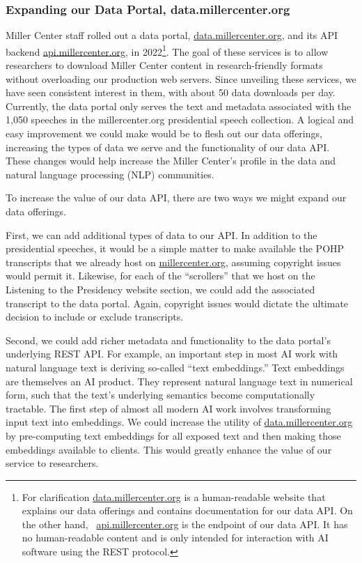 \documentclass[12pt, oneside]{article}   	%
\begin{document}
\subsubsection{Expanding our Data Portal, data.millercenter.org}\label{section.applications.easy.data-portal}
Miller Center staff rolled out a data portal, \href{https://data.millercenter.org}{data.millercenter.org}, and its API backend \href{https://api.millercenter.org}{api.millercenter.org}, in 2022\footnote{For clarification \href{https://data.millercenter.org}{data.millercenter.org} is a human-readable website that explains our data offerings and contains documentation for our data API.  On the other hand, \ \href{https://api.millercenter.org}{api.millercenter.org} is the endpoint of our data API.  It has no human-readable content and is only intended for interaction with AI software using the REST protocol.}.  The goal of these services is to allow researchers to download Miller Center content in research-friendly formats without overloading our production web servers.  Since unveiling these services, we have seen consistent interest in them, with about 50 data downloads per day.  Currently, the data portal only serves the text and  metadata associated with the 1,050 speeches in the millercenter.org presidential speech collection.   A logical and easy improvement we could make would be to flesh out our data offerings, increasing the types of data we serve and the functionality of our data API.  These changes would help increase the Miller Center's profile in the data and natural language processing (NLP) communities.

To increase the value of our data API, there are two ways we might expand our data offerings.  

First, we can add additional types of data to our API.  In addition to the presidential speeches, it would be a simple matter to make available the POHP transcripts that we already host on  \href{https://millercenter.org}{millercenter.org}, assuming copyright issues would permit it.  Likewise, for each of the “scrollers” that we host on the Listening to the Presidency website section, we could add the associated transcript to the data portal.   Again, copyright issues would dictate the ultimate decision to include or exclude transcripts. 

Second, we could add richer metadata and functionality to the data portal’s underlying REST API.  For example, an important step in most AI work with natural language text is deriving so-called “text embeddings.”  Text embeddings are themselves an AI product.  They represent natural language text in numerical form, such that the text’s underlying semantics become computationally tractable.  The first step of almost all modern AI work involves transforming input text into embeddings.  We could increase the utility of  \href{https://datamillercenter.org}{data.millercenter.org} by pre-computing text embeddings for all exposed text and then making those embeddings available to clients.  This would greatly enhance the value of our service to  researchers.  
\end{document}

